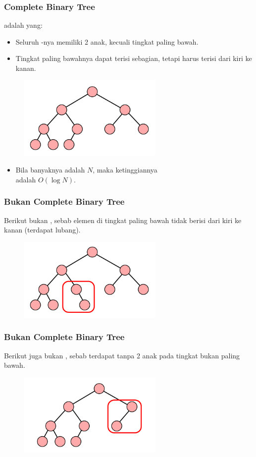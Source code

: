 \begin{frame}
\frametitle{Complete Binary Tree}
 adalah  yang:
\begin{itemize}
  \item Seluruh \fnode-nya memiliki 2 anak, kecuali tingkat paling bawah.
  \item Tingkat paling bawahnya dapat terisi sebagian, tetapi harus terisi dari kiri ke kanan.
\end{itemize}
\begin{figure}
  \includegraphics[width=7cm]{asset/complete-binary-tree.pdf}
\end{figure}
\begin{itemize}
  \item Bila banyaknya \fnode adalah $N$, maka ketinggiannya \\ adalah $O(\log{N})$.
\end{itemize}
\end{frame}

\begin{frame}
\frametitle{Bukan Complete Binary Tree}
Berikut bukan , sebab elemen di tingkat paling bawah tidak berisi dari kiri ke kanan (terdapat lubang).
\begin{figure}
  \includegraphics[width=7cm]{asset/not-complete-binary-tree-1.pdf}
\end{figure}
\end{frame}

\begin{frame}
\frametitle{Bukan Complete Binary Tree}
Berikut juga bukan , sebab terdapat \fnode tanpa 2 anak pada tingkat bukan paling bawah.
\begin{figure}
  \includegraphics[width=7cm]{asset/not-complete-binary-tree-2.pdf}
\end{figure}
\end{frame}

